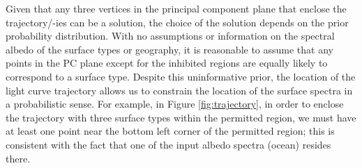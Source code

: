 \documentclass[iop,numberedappendix,apj]{emulateapj}
\begin{document}
Given that any three vertices in the principal component plane that enclose the trajectory/-ies can be a solution, the choice of the solution depends on the prior probability distribution. 
With no assumptions or information on the spectral albedo of the surface types or geography, it is reasonable to assume that any points in the PC plane except for the inhibited regions are equally likely to correspond to a surface type. 
Despite this uninformative prior, the location of the light curve trajectory allows us to constrain the location of the surface spectra in a probabilistic sense. 
For example, in Figure \ref{fig:trajectory}, in order to enclose the trajectory with three surface types within the permitted region, we must have at least one point near the bottom left corner of the permitted region; this is consistent with the fact that one of the input albedo spectra (ocean) resides there. 
\end{document}
